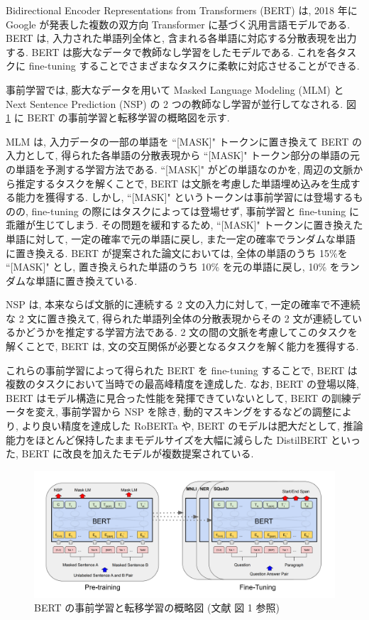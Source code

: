 Bidirectional Encoder Representations from Transformers (BERT) \cite{BERT} は, 2018 年に Google が発表した複数の双方向 Transformer に基づく汎用言語モデルである. BERT は, 入力された単語列全体と, 含まれる各単語に対応する分散表現を出力する. BERT は膨大なデータで教師なし学習をしたモデルである. これを各タスクに fine-tuning することでさまざまなタスクに柔軟に対応させることができる. \par
事前学習では, 膨大なデータを用いて Masked Language Modeling (MLM) と Next Sentence Prediction (NSP) の 2 つの教師なし学習が並行してなされる. 図 \ref{BERT_fine-tuning} に BERT の事前学習と転移学習の概略図を示す. \par
MLM は, 入力データの一部の単語を ``[MASK]" トークンに置き換えて BERT の入力として, 得られた各単語の分散表現から ``[MASK]" トークン部分の単語の元の単語を予測する学習方法である. ``[MASK]" がどの単語なのかを, 周辺の文脈から推定するタスクを解くことで, BERT は文脈を考慮した単語埋め込みを生成する能力を獲得する. しかし, ``[MASK]" というトークンは事前学習には登場するものの, fine-tuning の際にはタスクによっては登場せず, 事前学習と fine-tuning に乖離が生じてしまう. その問題を緩和するため, ``[MASK]" トークンに置き換えた単語に対して, 一定の確率で元の単語に戻し, また一定の確率でランダムな単語に置き換える. BERT が提案された論文においては, 全体の単語のうち 15\%を ``[MASK]" とし, 置き換えられた単語のうち 10\% を元の単語に戻し, 10\% をランダムな単語に置き換えている. \par
NSP は, 本来ならば文脈的に連続する 2 文の入力に対して, 一定の確率で不連続な 2 文に置き換えて, 得られた単語列全体の分散表現からその 2 文が連続しているかどうかを推定する学習方法である. 2 文の間の文脈を考慮してこのタスクを解くことで, BERT は, 文の交互関係が必要となるタスクを解く能力を獲得する. \par
これらの事前学習によって得られた BERT を fine-tuning することで, BERT は複数のタスクにおいて当時での最高峰精度を達成した. なお, BERT の登場以降, BERT はモデル構造に見合った性能を発揮できていないとして, BERT の訓練データを変え, 事前学習から NSP を除き, 動的マスキングをするなどの調整により, より良い精度を達成した RoBERTa \cite{RoBERT} や, BERT のモデルは肥大だとして, 推論能力をほとんど保持したままモデルサイズを大幅に減らした DistilBERT \cite{DistilBERT} といった, BERT に改良を加えたモデルが複数提案されている.\par

\begin{figure}[t]
    \centering
    \includegraphics[width=16cm]{assets/BERT_fine-tuning.png}
    \caption[BERT の事前学習と転移学習の概略図]{BERT の事前学習と転移学習の概略図 (文献 \cite{BERT} 図 1 参照)}
    \label{BERT_fine-tuning}
\end{figure}

